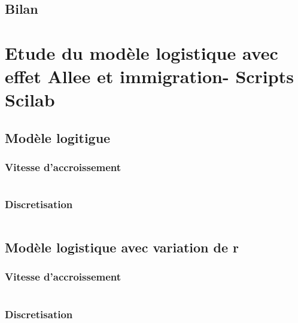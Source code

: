 \documentclass{article}
\begin{document}
\subsection{Bilan}
\paragraph{}


\newpage
\appendix

\section{Etude du modèle logistique avec effet Allee et immigration- Scripts Scilab}

\subsection{Modèle logitigue}

\subsubsection{Vitesse d'accroissement}

\begin{verbatim}
\end{verbatim}

\subsubsection{Discretisation}

\begin{verbatim}
\end{verbatim}

\subsection{Modèle logistique avec variation de r}

\subsubsection{Vitesse d'accroissement}

\begin{verbatim}
\end{verbatim}

\subsubsection{Discretisation}
\end{document}

